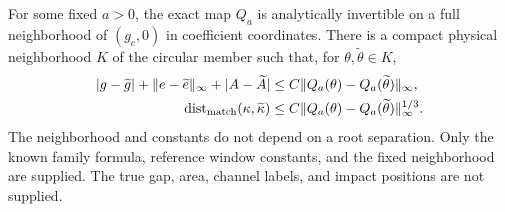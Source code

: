\begin{theorem}\label{thm:v8-four}
For some fixed $a>0$, the exact map $Q_a$ is analytically invertible
on a full neighborhood of $(g_c,0)$ in coefficient coordinates. There
is a compact physical neighborhood $K$ of the circular member such
that, for $\theta,\widetilde\theta\in K$,
\begin{align}
 |g-\widetilde g|+\|e-\widetilde e\|_\infty+|A-\widetilde A|
       &\le C\|Q_a(\theta)-Q_a(\widetilde\theta)\|_\infty,
                                        \label{eq:v8-fixed-stability}\\
 \operatorname{dist}_{\rm match}(\kappa,\widetilde\kappa)
       &\le C\|Q_a(\theta)-Q_a(\widetilde\theta)\|_\infty^{1/3}.
                                        \label{eq:v8-fixed-roots}
\end{align}
The neighborhood and constants do not depend on a root separation.
Only the known family formula, reference window constants, and the
fixed neighborhood are supplied. The true gap, area, channel labels,
and impact positions are not supplied.
\end{theorem}
